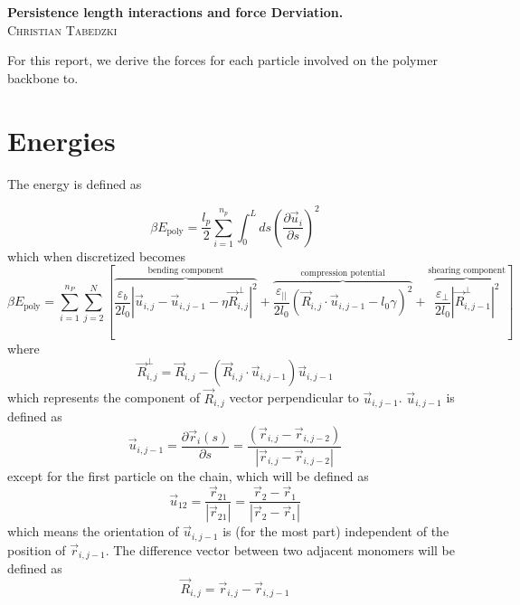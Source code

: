 \documentclass{article}
\renewcommand{\ij}{_{i,j}}
\newcommand{\ijj}{_{i,j-1}}
\newcommand{\ijk}{_{i,j-2}}
\newcommand{\magn}[1]{\left\vert #1 \right\vert }
\renewcommand{\part}[2]{\frac{\partial #1 }{\partial #2}}
\begin{document}
\begin{center}
  \textbf{Persistence length interactions and force Derviation.}\\
  \textsc{Christian Tabedzki}
\end{center} 


For this report, we derive the forces for each particle involved on the polymer backbone to.

\section{Energies}

The energy is defined as 

\begin{equation}
  \label{eqn:Energy_polymer}
  \beta E_{\text{poly}}  =  \frac{l_p}{2} \sum_{i=1}^{n_p} \int_0^L ds \left(\part{\vec{u}_i}{s}\right)^2
\end{equation}
which when discretized becomes
\begin{equation}
  \label{eqn:Energy_polymer_discrete}
  \beta E_{\text{poly}}  =  \sum_{i=1}^{n_P}  \sum_{j=2}^{N} \left[
  \overbrace{
  \frac{\varepsilon_b}{2 l_0}  \magn{ \vec{u} \ij - \vec{u} \ijj - \eta 
  \vec{R}\ij ^\bot} ^2 
  }^{\text{bending component}}
  +
\overbrace{
  \frac{\varepsilon_{\vert \vert}}{2 l_0} 
  \left( \vec{R}\ij \cdot \vec{u} \ijj - l_0 \gamma \right)^2 
  }^{\text{compression potential}}
  +
  \overbrace{
  \frac{\varepsilon _\perp}
  {2l_0} \magn{\vec{R}\ijj ^\perp}^2
  }^{\text{shearing component}}
  \right]
\end{equation}
where 
\[
\vec{R}\ij  ^\bot = \vec{R} \ij - \left(\vec{R} \ij \cdot \vec{u} \ijj \right) \vec{u} \ijj 
\]
which represents the component of \(\vec{R} \ij\) vector perpendicular to \(\vec{u} \ijj \).
\(\vec{u} \ijj \) is defined as  
  \[
  \vec{u}_{i,j-1} = 
  \part{\vec{{}r}_i(s)}{s} = 
    \frac{\left( \vec{r}\ij-\vec{r}\ijk \right)}{\magn{\vec{r}\ij - \vec{r}\ijk}} \]
except for the first particle on the chain, which will be defined as 
\[
  \vec{u}_{12} = \frac{\vec{r}_{21}}{\magn{\vec{r}_{21}}} = 
  \frac{\vec{r}_2 - \vec{r}_1}{\magn{\vec{r}_2 - \vec{r}_1}}
\]
which means the orientation of \(\vec{u}_{i,j-1}\) is (for the most part)
independent of the position of \(\vec{r}\ijj\). The difference vector between
two adjacent monomers will be defined as  
\[\vec{R} \ij = \vec{r} \ij - \vec{r} \ijj \]
\end{document}
